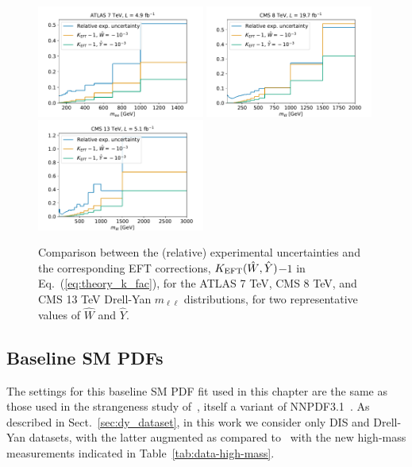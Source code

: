 \documentclass[withindex,glossary]{cam-thesis}
\begin{document}
\begin{figure}[t]
\centering
\includegraphics[width=0.49\textwidth]{dy_figures/atlas_7tev_kfacs.pdf}
\includegraphics[width=0.49\textwidth]{dy_figures/cms_8tev_kfacs.pdf}\\
\includegraphics[width=0.49\textwidth]{dy_figures/cms_13tev_kfacs.pdf}
\caption{\small Comparison between the (relative) experimental
  uncertainties and the corresponding EFT corrections,
$K_{\rm EFT}(\hat{W},\hat{Y})$$-$$1$ in Eq.~(\ref{eq:theory_k_fac}),
  for the ATLAS 7 TeV, CMS 8 TeV,
  and CMS 13 TeV Drell-Yan $m_{\ell\ell}$ distributions,
  for two representative values of  $\hat{W}$ and $\hat{Y}$.
  \label{fig:dysmeft}}
\end{figure}



\subsection{Baseline SM PDFs}
\label{sec:fitsettings}
The settings for this baseline SM PDF fit used in this chapter are the same as those used in the strangeness study
of~\cite{Faura:2020oom}, itself a variant of NNPDF3.1~\cite{Ball:2017nwa}. As described in Sect.~\ref{sec:dy_dataset}, in this work we consider only DIS
and Drell-Yan datasets, with the latter augmented as compared to~\cite{Faura:2020oom} with the new high-mass
measurements indicated in Table~\ref{tab:data-high-mass}.
\end{document}
